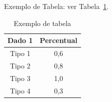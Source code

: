 Exemplo de Tabela: ver Tabela~\ref{tab:exetab}.


\begin{table}[!ht]
\begin{center}
\caption{Exemplo de tabela}
\label{tab:exetab}
\begin{tabular}{|c |c |}
\hline
\textbf{\textbf{Dado 1}} & \textbf{Percentual}\\
\hline\hline
Tipo 1 & 0,6 \\
Tipo 2 & 0,8 \\
Tipo 3 & 1,0 \\
Tipo 4 & 0,3 \\
\hline
\end{tabular}
\end{center}
\end{table}
